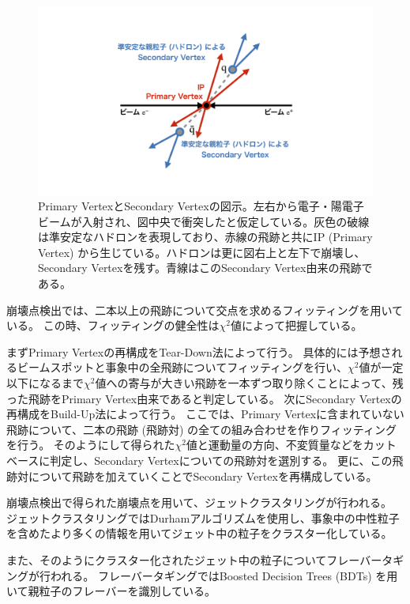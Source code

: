 \begin{figure}[htbp]
 \centering
 \includegraphics[trim = 0 100 0 50, width=1.0\textwidth, clip]{Figure/1Introduction/6ReconstructedVertex.png}
 \caption[Primary VertexとSecondary Vertexの図示]{Primary VertexとSecondary Vertexの図示。左右から電子・陽電子ビームが入射され、図中央で衝突したと仮定している。灰色の破線は準安定なハドロンを表現しており、赤線の飛跡と共にIP (Primary Vertex) から生じている。ハドロンは更に図右上と左下で崩壊し、Secondary Vertexを残す。青線はこのSecondary Vertex由来の飛跡である。}
 \label{6ReconstructedVertex}
\end{figure}

崩壊点検出では、二本以上の飛跡について交点を求めるフィッティングを用いている。
この時、フィッティングの健全性は$\chi^2$値によって把握している。

まずPrimary Vertexの再構成をTear-Down法によって行う。
具体的には予想されるビームスポットと事象中の全飛跡についてフィッティングを行い、$\chi^2$値が一定以下になるまで$\chi^2$値への寄与が大きい飛跡を一本ずつ取り除くことによって、残った飛跡をPrimary Vertex由来であると判定している。
次にSecondary Vertexの再構成をBuild-Up法によって行う。
ここでは、Primary Vertexに含まれていない飛跡について、二本の飛跡 (飛跡対) の全ての組み合わせを作りフィッティングを行う。
そのようにして得られた$\chi^2$値と運動量の方向、不変質量などをカットベースに判定し、Secondary Vertexについての飛跡対を選別する。
更に、この飛跡対について飛跡を加えていくことでSecondary Vertexを再構成している。


崩壊点検出で得られた崩壊点を用いて、ジェットクラスタリングが行われる。
ジェットクラスタリングではDurhamアルゴリズム\cite{Durhampaper}を使用し、事象中の中性粒子を含めたより多くの情報を用いてジェット中の粒子をクラスター化している。

また、そのようにクラスター化されたジェット中の粒子についてフレーバータギングが行われる。
フレーバータギングではBoosted Decision Trees (BDTs) を用いて親粒子のフレーバーを識別している。

